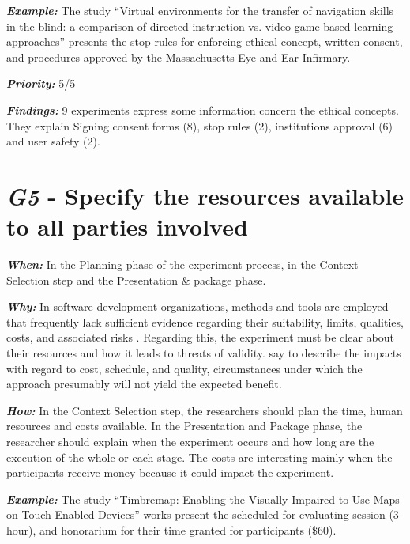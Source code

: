 \noindent \textit{\textbf{Example:}} The study ``Virtual environments for the transfer of navigation skills in the blind: a comparison of directed instruction vs. video game based learning approaches'' \cite{201449} presents the stop rules for enforcing ethical concept, written consent, and procedures approved by the Massachusetts Eye and Ear Infirmary.
\vspace{5mm}

\noindent \textit{\textbf{Priority:}} 5/5
\vspace{5mm}

\noindent \textit{\textbf{Findings:}} 9 experiments express some information concern the ethical concepts. They explain Signing consent forms (8), stop rules (2), institutions approval (6) and user safety (2).
\vspace{5mm}

\section{\textit{G5} - Specify the resources available to all parties involved}
\label{sec:guidelines-G5}

\noindent \textit{\textbf{When:}}  
In the Planning phase of the experiment process, in the Context Selection step and the Presentation \& package phase.
\vspace{5mm}

\noindent \textit{\textbf{Why:}} In software development organizations, methods and tools are employed that frequently lack sufficient evidence regarding their suitability, limits, qualities, costs, and associated risks \cite{Vinson2008AHumans}. Regarding this, the experiment must be clear about their resources and how it leads to threats of validity.  say to describe the impacts with regard to cost, schedule, and quality, circumstances under which the approach presumably will not yield the expected benefit.
\vspace{5mm}

\noindent \textit{\textbf{How:}} In the Context Selection step, the researchers should plan the time, human resources and costs available. In the Presentation and Package phase, the researcher should explain when the experiment occurs and how long are the execution of the whole or each stage. The costs are interesting mainly when the participants receive money because it could impact the experiment.
\vspace{5mm}

\noindent \textit{\textbf{Example:}} The study ``Timbremap: Enabling the Visually-Impaired to Use Maps on Touch-Enabled Devices'' \cite{Su2010} works present the scheduled for evaluating session (3-hour), and honorarium for their time granted for participants (\$60).
\vspace{5mm}

